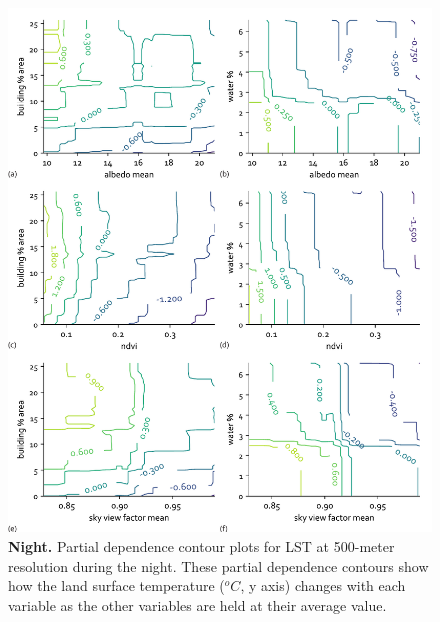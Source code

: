 \documentclass[final,3p,times,onecolumn,sort&compress]{elsarticle}
\begin{document}
\begin{figure}[h]
    \centering
    \includegraphics[width=\linewidth]{fig/report/pdp_2d_night_500.pdf}
    \caption[Partial dependence contour plots for LST at 500-meter resolution during the night]{
    \textbf{Night.} Partial dependence contour plots for LST at 500-meter resolution during the night.
    These partial dependence contours show how the land surface temperature ($^oC$, y axis) changes with each variable as the other variables are held at their average value.
    }
    \label{fig:pdp_2dnight_500}
\end{figure}
\end{document}
